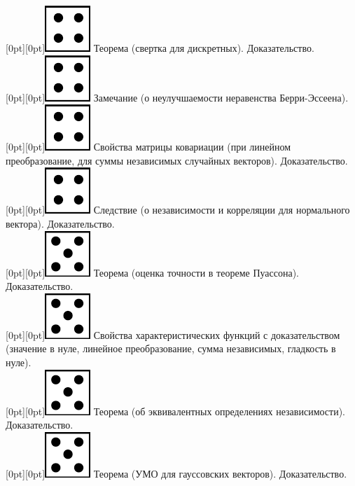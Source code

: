 \documentclass[10pt]{article}
\begin{document}
\raisebox{-1pt}[0pt][0pt]{\includegraphics[width=0.02\linewidth]{4.png}} Теорема (свертка для дискретных). Доказательство. \\

\raisebox{-1pt}[0pt][0pt]{\includegraphics[width=0.02\linewidth]{4.png}} Замечание (о неулучшаемости неравенства Берри-Эссеена). \\

\raisebox{-1pt}[0pt][0pt]{\includegraphics[width=0.02\linewidth]{4.png}} Свойства матрицы ковариации (при линейном преобразование, для суммы независимых случайных векторов). Доказательство. \\

\raisebox{-1pt}[0pt][0pt]{\includegraphics[width=0.02\linewidth]{4.png}} Следствие (о независимости и корреляции для нормального вектора). Доказательство. \\

\raisebox{-1pt}[0pt][0pt]{\includegraphics[width=0.02\linewidth]{5.png}} Теорема (оценка точности в теореме Пуассона). Доказательство. \\

\raisebox{-1pt}[0pt][0pt]{\includegraphics[width=0.02\linewidth]{5.png}} Свойства характеристических функций с доказательством (значение в нуле, линейное преобразование, сумма независимых, гладкость в нуле). \\

\raisebox{-1pt}[0pt][0pt]{\includegraphics[width=0.02\linewidth]{5.png}} Теорема (об эквивалентных определениях независимости). Доказательство. \\

\raisebox{-1pt}[0pt][0pt]{\includegraphics[width=0.02\linewidth]{5.png}} Теорема (УМО для гауссовских векторов). Доказательство. \\
\end{document}
